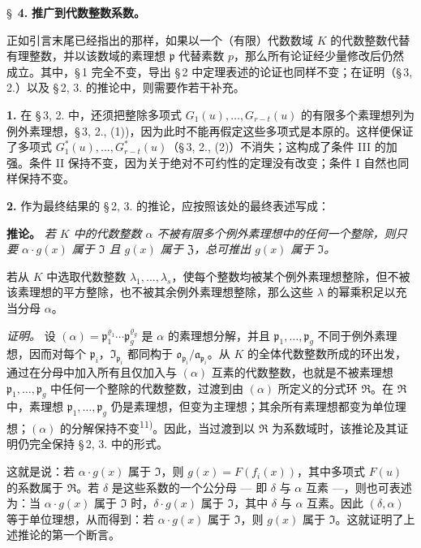 \bigskip
\S~\textbf{4.}
\textbf{推广到代数整数系数。}

\smallskip

\noindent
正如引言末尾已经指出的那样，如果以一个（有限）代数数域 $K$ 的代数整数代替有理整数，并以该数域的素理想 $\mathfrak{p}$ 代替素数 $p$，那么所有论证经少量修改后仍然成立。其中，\S\,1 完全不变，导出 \S\,2 中定理表述的论证也同样不变；在证明（\S\,3, 2.）以及 \S\,2, 3. 的推论中，则需要作若干补充。

\medskip\noindent\textbf{1.}
在 \S\,3, 2. 中，还须把整除多项式 $G_1(u),\ldots,G_{r-t}(u)$ 的有限多个素理想列为例外素理想，\S\,3, 2., (1))，因为此时不能再假定这些多项式是本原的。这样便保证了多项式 $G^*_1(u),\ldots,G^*_{r-t}(u)$（\S\,3, 2., (2)）不消失；这构成了条件 III 的加强。条件 II 保持不变，因为关于绝对不可约性的定理没有改变；条件 I 自然也同样保持不变。

\medskip\noindent\textbf{2.}
作为最终结果的 \S\,2, 3. 的推论，应按照该处的最终表述写成：

\noindent\textbf{推论。}
\textit{若 $K$ 中的代数整数 $\alpha$ 不被有限多个例外素理想中的任何一个整除，则只要 $\alpha \cdot g(x)$ 属于 $\mathfrak{I}$ 且 $g(x)$ 属于 $\mathfrak{Z}$，总可推出 $g(x)$ 属于 $\mathfrak{I}$。}

若从 $K$ 中选取代数整数 $\lambda_1,\ldots,\lambda_s$，使每个整数均被某个例外素理想整除，但不被该素理想的平方整除，也不被其余例外素理想整除，那么这些 $\lambda$ 的幂乘积足以充当分母 $\alpha$。

\noindent\textit{证明。}
设 $(\alpha) = \mathfrak{p}_1^{\varrho_1} \cdots \mathfrak{p}_g^{\varrho_g}$ 是 $\alpha$ 的素理想分解，并且 $\mathfrak{p}_1,\ldots,\mathfrak{p}_g$ 不同于例外素理想，因而对每个 $\mathfrak{p}_i$，$\mathfrak{I}_{\mathfrak{p}_i}$ 都同构于 $\mathfrak{o}_{\mathfrak{p}_i}/\mathfrak{a}_{\mathfrak{p}_i}$。从 $K$ 的全体代数整数所成的环出发，通过在分母中加入所有且仅加入与 $(\alpha)$ 互素的代数整数，也就是不被素理想 $\mathfrak{p}_1,\ldots,\mathfrak{p}_g$ 中任何一个整除的代数整数，过渡到由 $(\alpha)$ 所定义的分式环 $\mathfrak{R}$。在 $\mathfrak{R}$ 中，素理想 $\mathfrak{p}_1,\ldots,\mathfrak{p}_g$ 仍是素理想，但变为主理想；其余所有素理想都变为单位理想；$(\alpha)$ 的分解保持不变\textsuperscript{11)}。因此，当过渡到以 $\mathfrak{R}$ 为系数域时，该推论及其证明仍完全保持 \S\,2, 3. 中的形式。

这就是说：若 $\alpha \cdot g(x)$ 属于 $\mathfrak{I}$，则 $g(x) = F(f_i(x))$，其中多项式 $F(u)$ 的系数属于 $\mathfrak{R}$。若 $\delta$ 是这些系数的一个公分母 --- 即 $\delta$ 与 $\alpha$ 互素 ---，则也可表述为：当 $\alpha \cdot g(x)$ 属于 $\mathfrak{I}$ 时，$\delta \cdot g(x)$ 属于 $\mathfrak{I}$，其中 $\delta$ 与 $\alpha$ 互素。因此 $(\delta, \alpha)$ 等于单位理想，从而得到：若 $\alpha \cdot g(x)$ 属于 $\mathfrak{I}$，则 $g(x)$ 属于 $\mathfrak{I}$。这就证明了上述推论的第一个断言。

